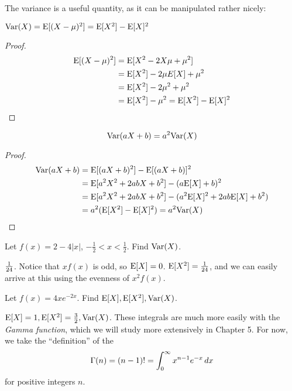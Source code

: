 \documentclass[../main.tex]{subfiles}
\begin{document}
The variance is a useful quantity, as it can be manipulated rather nicely: 
\begin{theorem}
$\mathrm{Var}(X) = \mathrm E[(X-\mu)^2] = \mathrm E[X^2] - \mathrm E[X]^2$
\end{theorem}
\begin{proof}
\begin{align*}
    \mathrm E[(X-\mu)^2] &= \mathrm E[X^2 - 2X\mu + \mu^2] \\
    &= \mathrm E[X^2] - 2\mu E[X] + \mu^2 \\
    &= \mathrm E[X^2] - 2\mu^2 + \mu^2 \\
    &= \mathrm E[X^2] - \mu^2 = \mathrm E[X^2] - \mathrm E[X]^2
\end{align*}
\end{proof}

\begin{theorem}
\[
    \mathrm{Var}(aX+b) = a^2\mathrm{Var}(X)
\]
\end{theorem}
\begin{proof}
\begin{align*}
    \mathrm{Var}(aX+b) &= \mathrm E[(aX+b)^2] - \mathrm E[(aX+b)]^2 \\
    &= \mathrm E[a^2X^2 + 2abX + b^2] - (a\mathrm E[X] + b)^2 \\
    &= \mathrm E[a^2X^2 + 2abX + b^2] - (a^2\mathrm E[X]^2 + 2ab\mathrm E[X] + b^2) \\
    &= a^2(\mathrm E[X^2] - \mathrm E[X]^2) = a^2 \mathrm{Var}(X)
\end{align*}
\end{proof}

\begin{example}
    Let $f(x) = 2 - 4|x|$, $-\frac 12 < x < \frac 12$. Find $\mathrm{Var}(X)$. 
\end{example}
\begin{solution}
$\frac{1}{24}$. Notice that $xf(x)$ is odd, so $\mathrm E[X] = 0$. $\mathrm E[X^2] = \frac{1}{24}$, and we can easily arrive at this using the evenness of $x^2 f(x)$. 
\end{solution}

\begin{example}
    Let $f(x) = 4xe^{-2x}$. Find $\mathrm E[X], \mathrm E[X^2], \mathrm{Var}(X)$. 
\end{example}
\begin{solution}
$\mathrm E[X] = 1, \mathrm E[X^2] = \frac32, \mathrm{Var}(X)$. These integrals are much more easily with the \textit{Gamma function}, which we will study more extensively in Chapter 5. For now, we take the ``definition'' of the  
\[
    \Gamma(n) = (n-1)! = \int_0^\infty x^{n-1} e^{-x} \,dx
\]
for positive integers $n$. 
\end{solution}
\end{document}
